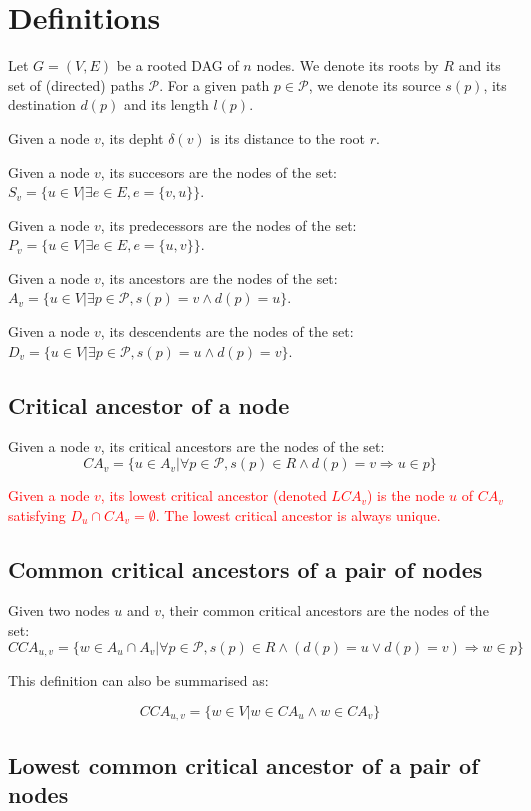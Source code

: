 \documentclass{paper}
\begin{document}
\section{Definitions}

Let $G=(V,E)$ be a rooted DAG of $n$ nodes. We denote its roots by $R$ and its set of (directed) paths $\mathcal{P}$. For a given path $p\in\mathcal{P}$, we denote its source $s(p)$, its destination $d(p)$ and its length $l(p)$.

Given a node $v$, its depht $\delta(v)$ is its distance to the root $r$.

Given a node $v$, its succesors are the nodes of the set: $S_v=\{u\in V|\exists e\in E, e=\{v,u\}\}$.

Given a node $v$, its predecessors are the nodes of the set: $P_v=\{u\in V|\exists e\in E, e=\{u,v\}\}$.

Given a node $v$, its ancestors are the nodes of the set: $A_v=\{u\in V|\exists p\in \mathcal{P}, s(p)=v\wedge d(p)=u\}$.

Given a node $v$, its descendents are the nodes of the set: $D_v=\{u\in V|\exists p\in \mathcal{P},  s(p)=u \wedge d(p)=v\}$.

\subsection{Critical ancestor of a node}

Given a node $v$, its critical ancestors are the nodes of the set:
\[
CA_v=\{u\in A_v|\forall p\in \mathcal{P}, s(p)\in R\wedge d(p)=v\Rightarrow u\in p\}
\]


\textcolor{red}{Given a node $v$, its lowest critical ancestor (denoted $LCA_v$) is the node $u$ of $CA_v$ satisfying $D_u\cap CA_v=\emptyset$. The lowest critical ancestor is always unique.} 

\subsection{Common critical ancestors of a pair of nodes}
Given two nodes $u$ and $v$, their common critical ancestors are the nodes of the set:
\[
CCA_{u,v} = \{w\in A_u \cap A_v |\forall p\in \mathcal{P}, s(p)\in R\wedge (d(p)=u \lor d(p) = v)\Rightarrow w\in p\}
\]

This definition can also be summarised as:

\[
CCA_{u,v} = \{w\in V | w \in CA_u \wedge w \in CA_v\}
\]

\subsection{Lowest common critical ancestor of a pair of nodes}
\end{document}
